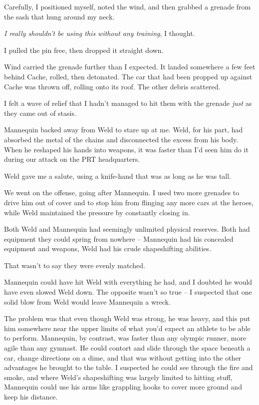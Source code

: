 Carefully, I positioned myself, noted the wind, and then grabbed a grenade from the sash that hung around my neck.



\emph{I really shouldn't be using this without any training}, I thought.



I pulled the pin free, then dropped it straight down.



Wind carried the grenade further than I expected.  It landed somewhere a few feet behind Cache, rolled, then detonated.  The car that had been propped up against Cache was thrown off, rolling onto its roof.  The other debris scattered.



I felt a wave of relief that I hadn't managed to hit them with the grenade \emph{just} as they came out of stasis.



Mannequin backed away from Weld to stare up at me.  Weld, for his part, had absorbed the metal of the chains and disconnected the excess from his body.  When he reshaped his hands into weapons, it was faster than I'd seen him do it during our attack on the PRT headquarters.



Weld gave me a salute, using a knife-hand that was as long as he was tall.



We went on the offense, going after Mannequin.  I used two more grenades to drive him out of cover and to stop him from flinging any more cars at the heroes, while Weld maintained the pressure by constantly closing in.



Both Weld and Mannequin had seemingly unlimited physical reserves.  Both had equipment they could spring from nowhere – Mannequin had his concealed equipment and weapons, Weld had his crude shapeshifting abilities.



That wasn't to say they were evenly matched.



Mannequin could have hit Weld with everything he had, and I doubted he would have even slowed Weld down.  The opposite wasn't so true – I suspected that one solid blow from Weld would leave Mannequin a wreck.



The problem was that even though Weld was strong, he was heavy, and this put him somewhere near the upper limits of what you'd expect an athlete to be able to perform.  Mannequin, by contrast, was faster than any olympic runner, more agile than any gymnast.  He could contort and slide through the space beneath a car, change directions on a dime, and that was without getting into the other advantages he brought to the table.  I suspected he could see through the fire and smoke, and where Weld's shapeshifting was largely limited to hitting stuff, Mannequin could use his arms like grappling hooks to cover more ground and keep his distance.



